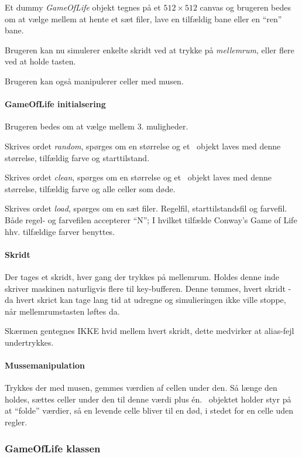 Et dummy \emph{GameOfLife} objekt tegnes på et $512\times512$ canvas og
brugeren bedes om at vælge mellem at hente et sæt filer, lave en tilfældig bane eller en ``ren'' bane.

Brugeren kan nu simulerer enkelte skridt ved at trykke på \emph{mellemrum},
eller flere ved at holde tasten.

Brugeren kan også manipulerer celler med musen.

\paragraph{ GameOfLife  initialsering }
Brugeren bedes om at vælge mellem 3. muligheder.

Skrives ordet \emph{random}, spørges om en størrelse og et \gol~objekt laves med denne størrelse, tilfældig farve og starttilstand.

Skrives ordet \emph{clean}, spørges om en størrelse og et \gol~objekt laves med denne størrelse, tilfældig farve og alle celler som døde.

Skrives ordet \emph{load}, spørges om en sæt filer.
Regelfil, starttilstandsfil og farvefil. Både regel- og farvefilen accepterer ``N'';
I hvilket tilfælde Conway's Game of Life hhv. tilfældige farver benyttes.

\paragraph{ Skridt }
Der tages et skridt, hver gang der trykkes på mellemrum. Holdes denne inde skriver maskinen naturligvis flere til key-bufferen.
Denne tømmes, hvert skridt - da hvert skrict kan tage lang tid at udregne og simulieringen ikke ville stoppe, når mellemrumstasten løftes da.

Skærmen gentegnes IKKE hvid mellem hvert skridt, dette medvirker at alias-fejl undertrykkes.

\paragraph{ Mussemanipulation }
Trykkes der med musen, gemmes værdien af cellen under den. Så længe den holdes, sættes celler under den til denne værdi plus én.
\gol~objektet holder styr på at ``folde'' værdier, så en levende celle bliver til en død, i stedet for en celle uden regler.


\subsubsection{ GameOfLife klassen}

